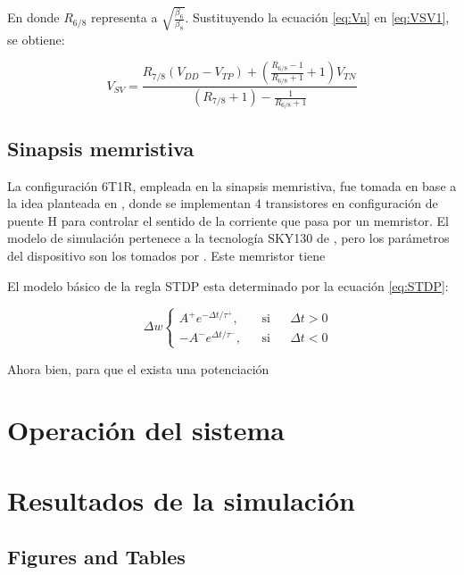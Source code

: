 \documentclass[conference]{IEEEtran}
\begin{document}
En donde $R_{6/8}$ representa a $\sqrt{\frac{\beta_{6}}{\beta_{8}}}$. Sustituyendo la ecuación \ref{eq:Vn} en \ref{eq:VSV1}, se obtiene:

\begin{equation}
	V_{SV} = \frac{R_{7/8}(V_{DD}-V_{TP})+\left(\frac{R_{6/8}-1}{R_{6/8}+1}+1\right)V_{TN}}{\left(R_{7/8}+1\right)-\frac{1}{R_{6/8}+1}}
	\label{eq:VSV2}
\end{equation}

\subsection{Sinapsis memristiva}
La configuración 6T1R, empleada en la sinapsis memristiva, fue tomada en base a la idea planteada en \cite{Tian_2022}, donde se implementan 4 transistores en configuración de puente H para controlar el sentido de la corriente que pasa por un memristor. El modelo de simulación pertenece a la tecnología SKY130 de \cite{SKY130reram}\cite{SKY130reramGitHub}, pero los parámetros del dispositivo son los tomados por \cite{Wang_2016}\cite{Alshaya_2022}. Este memristor tiene 

El modelo básico de la regla STDP esta determinado por la ecuación \ref{eq:STDP}:

\begin{equation}
    \quad \Delta w
        \left \{
            \begin{aligned}
                A^{+}e^{-\Delta t/\tau^{+}}, & & \text{si} & & \Delta t > 0 \\
                -A^{-}e^{\Delta t/\tau^{-}}, & & \text{si} & & \Delta t < 0
            \end{aligned}
        \right.
    \label{eq:STDP}
\end{equation}

Ahora bien, para que el exista una potenciación

\section{Operación del sistema}

\section{Resultados de la simulación}


\subsection{Figures and Tables}
\end{document}
